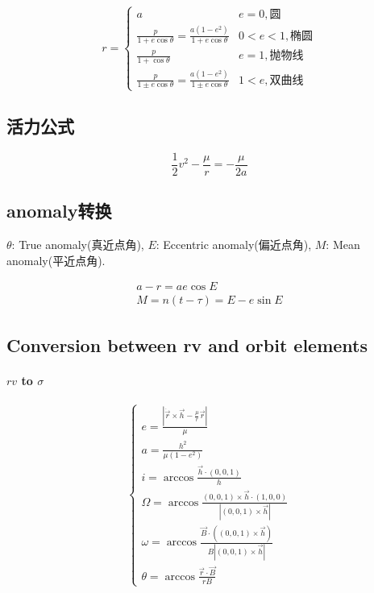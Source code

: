 \documentclass[UTF8]{ctexart}
\begin{document}
\begin{equation}
	r=
	\begin{cases}
		a & e=0,\text{圆}\\
		\frac{p}{1+e\cos\theta}=\frac{a(1-e^2)}{1+e\cos\theta} & 0<e<1,\text{椭圆}\\
		\frac{p}{1+\cos\theta} & e=1,\text{抛物线}\\
		\frac{p}{1\pm e\cos\theta}=\frac{a(1-e^2)}{1\pm e\cos\theta} & 1<e,\text{双曲线}
	\end{cases}
\end{equation}

\subsection{活力公式}
\begin{equation}
	\frac{1}{2}v^2-\frac{\mu}{r}=-\frac{\mu}{2a}
\end{equation}

\subsection{anomaly转换}

$\theta$: True anomaly(真近点角), $E$: Eccentric anomaly(偏近点角), $M$: Mean anomaly(平近点角).

\begin{gather}
	a-r=ae\cos E\\
	M=n(t-\tau)=E-e\sin E
\end{gather}

\subsection{Conversion between rv and orbit elements}
\paragraph{$rv$ to $\sigma$}
\begin{equation}
	\begin{cases}
		e=\frac{|\dot{\vec{r}}\times\vec{h}-\frac{\mu}{r}\vec{r}|}{\mu}\\
		a=\frac{h^2}{\mu(1-e^2)}\\
		i=\arccos{\frac{\vec{h}\cdot(0,0,1)}{h}}\\
		\Omega=\arccos\frac{(0,0,1)\times\vec{h}\cdot(1,0,0)}{|(0,0,1)\times\vec{h}|}\\
		\omega=\arccos\frac{\vec{B}\cdot((0,0,1)\times\vec{h})}{B|(0,0,1)\times\vec{h}|}\\
		\theta=\arccos\frac{\vec{r}\cdot\vec{B}}{rB}
	\end{cases}
\end{equation}


\end{document}
